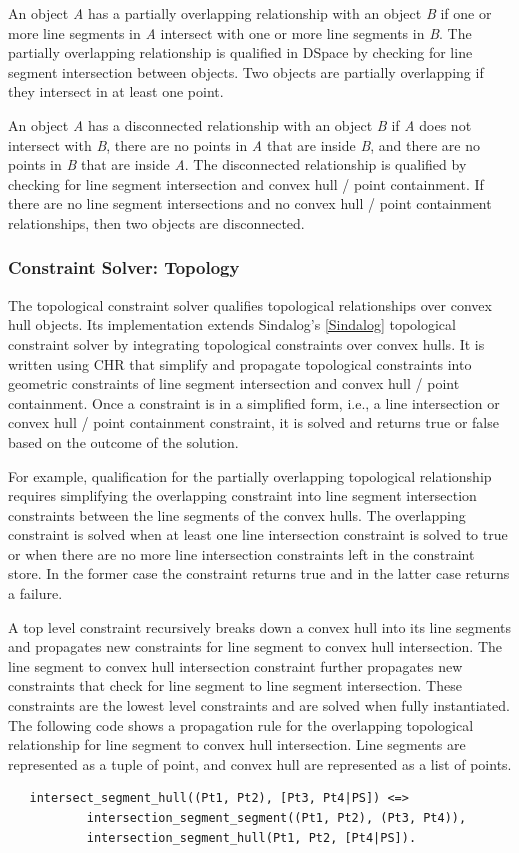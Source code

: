 \documentclass[12pt]{ucthesis}
\begin{document}
An object \emph{A} has a partially overlapping relationship with an object \emph{B} if one or more line segments in \emph{A} intersect with one or more line segments in \emph{B}. The partially overlapping relationship is qualified in DSpace by checking for line segment intersection between objects. Two objects are partially overlapping if they intersect in at least one point.  

An object \emph{A} has a disconnected relationship with an object \emph{B} if \emph{A} does not intersect with \emph{B}, there are no points in \emph{A} that are inside \emph{B}, and there are no points in \emph{B} that are inside \emph{A}. The disconnected relationship is qualified by checking for line segment intersection and convex hull / point containment. If there are no line segment intersections and no convex hull / point containment relationships, then two objects are disconnected.  

\subsubsection{Constraint Solver: Topology}
The topological constraint solver qualifies topological relationships over convex hull objects. Its implementation extends Sindalog's \ref{Sindalog} topological constraint solver by integrating topological constraints over convex hulls. It is written using CHR that simplify and propagate topological constraints into geometric constraints of line segment intersection and convex hull / point containment. Once a constraint is in a simplified form, i.e., a line intersection or convex hull / point containment constraint, it is solved and returns true or false based on the outcome of the solution.   

For example, qualification for the partially overlapping topological relationship requires simplifying the overlapping constraint into line segment intersection constraints between the line segments of the convex hulls. The overlapping constraint is solved when at least one line intersection constraint is solved to true or when there are no more line intersection constraints left in the constraint store. In the former case the constraint returns true and in the latter case returns a failure. 

A top level constraint recursively breaks down a convex hull into its line segments and propagates new constraints for line segment to convex hull intersection. The line segment to convex hull intersection constraint further propagates new constraints that check for line segment to line segment intersection. These constraints are the lowest level constraints and are solved when fully instantiated. The following code shows a propagation rule for the overlapping topological relationship for line segment to convex hull intersection. Line segments are represented as a tuple of point, and convex hull are represented as a list of points.   
\begin{verbatim}
   intersect_segment_hull((Pt1, Pt2), [Pt3, Pt4|PS]) <=>
           intersection_segment_segment((Pt1, Pt2), (Pt3, Pt4)),
           intersection_segment_hull(Pt1, Pt2, [Pt4|PS]).
\end{verbatim}
\end{document}
